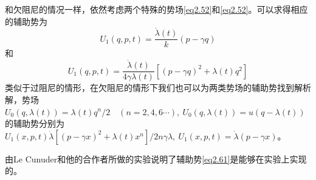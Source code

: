 和欠阻尼的情况一样，依然考虑两个特殊的势场\eqref{eq2.52}和\eqref{eq2.52}。可以求得相应的辅助势为
\begin{equation}
    U_{1}(q, p, t)=\frac{\dot{\lambda}(t)}{k}(p-\gamma q)
    \label{eq2.61}
\end{equation}
和
\begin{equation}
    U_{1}(q, p, t)=\frac{\dot{\lambda}(t)}{4 \gamma \lambda(t)}\left[(p-\gamma q)^{2}+\lambda(t) q^{2}\right]
    \label{eq2.62}
\end{equation}
类似于过阻尼的情形，在欠阻尼的情形下我们也可以为两类势场的辅助势找到解析解\cite{Li2016}，势场$U_0 (q, \lambda(t))= \lambda(t) q^{n} / 2 \quad (n=2,4,6\cdots) ,\ U_{0}(q, \lambda(t))=u(q-\lambda(t))$的辅助势分别为$U_{1}(x, p, t)\dot{\lambda}\left[(p-\gamma x)^{2}+\lambda(t) x^{n}\right] / 2 n \gamma \lambda ,\ U_{1}(x, p, t)=\dot{\lambda}(p-\gamma x)$。

由Le Cunuder和他的合作者\cite{LeCunuder2016}所做的实验说明了辅助势\eqref{eq2.61}是能够在实验上实现的。











